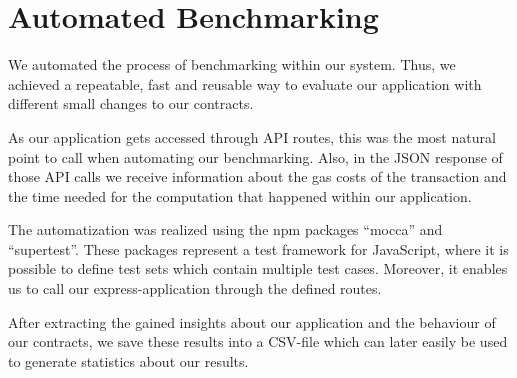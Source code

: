 \section{Automated Benchmarking}

We automated the process of benchmarking within our system. 
Thus, we achieved a repeatable, fast and reusable way to evaluate our application with different small changes to our contracts.

As our application gets accessed through API routes, this was the most natural point to call when automating our benchmarking. 
Also, in the JSON response of those API calls we receive information about the gas costs of the transaction and the time needed for the computation that happened within our application.

The automatization was realized using the npm packages ``mocca'' and ``supertest''. 
These packages represent a test framework for JavaScript, where it is possible to define test sets which contain multiple test cases.
 Moreover, it enables us to call our express-application through the defined routes.

After extracting the gained insights about our application and the behaviour of our contracts, we save these results into a CSV-file which can later easily be used to generate statistics about our results.
